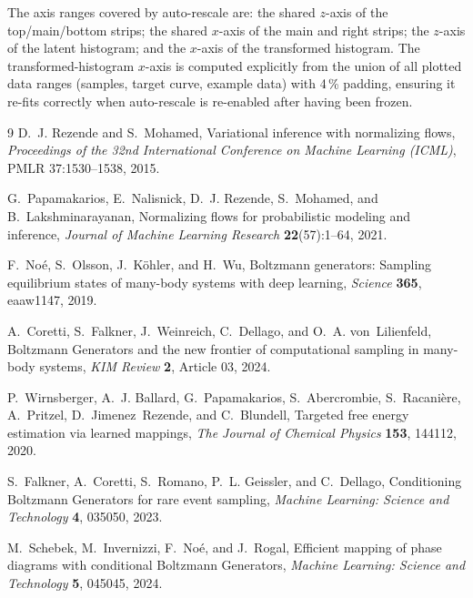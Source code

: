 \documentclass[11pt,a4paper]{article}
\begin{document}
The axis ranges covered by auto-rescale are: the shared $z$-axis of the
top/main/bottom strips; the shared $x$-axis of the main and right strips;
the $z$-axis of the latent histogram; and the $x$-axis of the transformed
histogram.  The transformed-histogram $x$-axis is computed explicitly from
the union of all plotted data ranges (samples, target curve, example data)
with 4\,\% padding, ensuring it re-fits correctly when auto-rescale is
re-enabled after having been frozen.

\begin{thebibliography}{9}
D.~J. Rezende and S.~Mohamed,
\newblock Variational inference with normalizing flows,
\newblock \emph{Proceedings of the 32nd International Conference on Machine
Learning (ICML)}, PMLR 37:1530--1538, 2015.

G.~Papamakarios, E.~Nalisnick, D.~J. Rezende, S.~Mohamed, and
B.~Lakshminarayanan,
\newblock Normalizing flows for probabilistic modeling and inference,
\newblock \emph{Journal of Machine Learning Research} \textbf{22}(57):1--64,
2021.

F.~No\'e, S.~Olsson, J.~K\"ohler, and H.~Wu,
\newblock Boltzmann generators: Sampling equilibrium states of many-body
systems with deep learning,
\newblock \emph{Science} \textbf{365}, eaaw1147, 2019.

A.~Coretti, S.~Falkner, J.~Weinreich, C.~Dellago, and O.~A. von~Lilienfeld,
\newblock Boltzmann Generators and the new frontier of computational sampling
in many-body systems,
\newblock \emph{KIM Review} \textbf{2}, Article 03, 2024.

P.~Wirnsberger, A.~J. Ballard, G.~Papamakarios, S.~Abercrombie,
S.~Racani\`ere, A.~Pritzel, D.~Jimenez~Rezende, and C.~Blundell,
\newblock Targeted free energy estimation via learned mappings,
\newblock \emph{The Journal of Chemical Physics} \textbf{153}, 144112, 2020.

S.~Falkner, A.~Coretti, S.~Romano, P.~L. Geissler, and C.~Dellago,
\newblock Conditioning Boltzmann Generators for rare event sampling,
\newblock \emph{Machine Learning: Science and Technology} \textbf{4}, 035050,
2023.

M.~Schebek, M.~Invernizzi, F.~No\'e, and J.~Rogal,
\newblock Efficient mapping of phase diagrams with conditional Boltzmann
Generators,
\newblock \emph{Machine Learning: Science and Technology} \textbf{5}, 045045,
2024.


\end{thebibliography}
\end{document}

